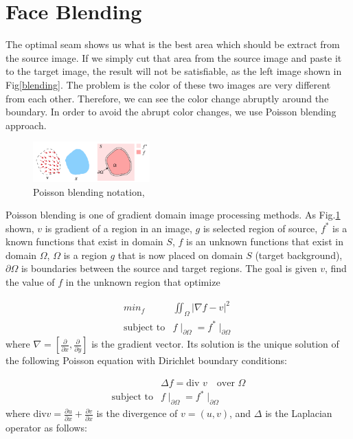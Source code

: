 \documentclass[10pt,twocolumn,letterpaper]{article}
\begin{document}
\section{Face Blending}

The optimal seam shows us what is the best area which should be extract from the source image. If we simply cut that area from the source image and paste it to the target image, the result will not be satisfiable, as the left image shown in Fig\ref{blending}. The problem is the color of these two images are very different from each other. Therefore, we can see the color change abruptly around the boundary. In order to avoid the abrupt color changes, we use Poisson blending approach.

\begin{figure}[hb]
  \centering
  \includegraphics[width=0.4\textwidth]{poisson_blending_alg.png}
  \caption{Poisson blending notation, \cite{perez2003poisson} }\label{blending_alg}
\end{figure}

Poisson blending is one of gradient domain image processing methods. As Fig.\ref{blending_alg} shown, $v$ is gradient of a region in an image, $g$ is selected region of source, $f^*$ is a known functions that exist in domain $S$, $f$ is an unknown functions that exist in domain $\Omega$, $\Omega$ is a region $g$ that is now placed on domain $S$ (target background), $\partial{\Omega}$ is boundaries between the source and target regions. The goal is given $v$, find the value of $f$ in the unknown region that optimize

\begin{eqnarray}
min_{f} & \iint_{\Omega} \vert \nabla f -v \vert^2  \\
\mbox{subject to} & f \mid_{\partial{\Omega}} = f^* \mid_{\partial{\Omega}}
\end{eqnarray}
where $\nabla = [\frac{\partial{}}{\partial{x}}, \frac{\partial{}}{\partial{y}}]$ is the gradient vector. Its solution is the unique solution of the following Poisson equation with Dirichlet boundary conditions:

\begin{eqnarray}
& \Delta f = \mbox{div }v \quad \mbox{over } \Omega \\
\mbox{subject to} & f \mid_{\partial{\Omega}} = f^* \mid_{\partial{\Omega}}
\end{eqnarray}
where $\mbox{div} v = \frac{\partial{u}}{\partial{x}} + \frac{\partial{v}}{\partial{x}}$ is the divergence of $v = (u,v)$, and $\Delta$ is the Laplacian operator as follows:
\end{document}
